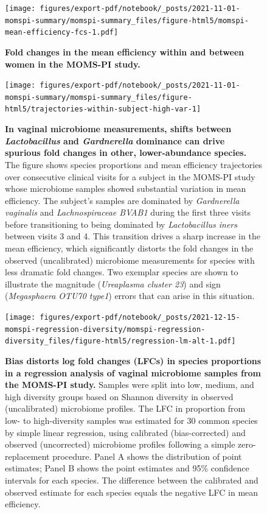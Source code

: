 \documentclass[
]{article}
\begin{document}
\begin{figure}
\centering
\texttt{[image: figures/export-pdf/notebook/\_posts/2021-11-01-momspi-summary/momspi-summary\_files/figure-html5/momspi-mean-efficiency-fcs-1.pdf]}
\caption{\label{fig:momspi-mean-efficiency-fcs}\textbf{Fold changes in the mean efficiency within and between women in the MOMS-PI study.}}
\end{figure}



\begin{figure}
\texttt{[image: figures/export-pdf/notebook/\_posts/2021-11-01-momspi-summary/momspi-summary\_files/figure-html5/trajectories-within-subject-high-var-1]} \caption{\textbf{In vaginal microbiome measurements, shifts between \emph{Lactobacillus} and \emph{Gardnerella} dominance can drive spurious fold changes in other, lower-abundance species.} The figure shows species proportions and mean efficiency trajectories over consecutive clinical visits for a subject in the MOMS-PI study whose microbiome samples showed substantial variation in mean efficiency. The subject's samples are dominated by \emph{Gardnerella vaginalis} and \emph{Lachnospiraceae BVAB1} during the first three visits before transitioning to being dominated by \emph{Lactobacillus iners} between visits 3 and 4. This transition drives a sharp increase in the mean efficiency, which significantly distorts the fold changes in the observed (uncalibrated) microbiome measurements for species with less dramatic fold changes. Two exemplar species are shown to illustrate the magnitude (\emph{Ureaplasma cluster 23}) and sign (\emph{Megasphaera OTU70 type1}) errors that can arise in this situation.}\label{fig:momspi-trajectory}
\end{figure}



\begin{figure}
\centering
\texttt{[image: figures/export-pdf/notebook/\_posts/2021-12-15-momspi-regression-diversity/momspi-regression-diversity\_files/figure-html5/regression-lm-alt-1.pdf]}
\caption{\label{fig:momspi-regression}\textbf{Bias distorts log fold changes (LFCs) in species proportions in a regression analysis of vaginal microbiome samples from the MOMS-PI study.} Samples were split into low, medium, and high diversity groups based on Shannon diversity in observed (uncalibrated) microbiome profiles. The LFC in proportion from low- to high-diversity samples was estimated for 30 common species by simple linear regression, using calibrated (bias-corrected) and observed (uncorrected) microbiome profiles following a simple zero-replacement procedure. Panel A shows the distribution of point estimates; Panel B shows the point estimates and 95\% confidence intervals for each species. The difference between the calibrated and observed estimate for each species equals the negative LFC in mean efficiency.}
\end{figure}
\end{document}
